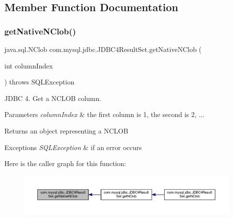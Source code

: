 \subsection{Member Function Documentation}
\mbox{\label{classcom_1_1mysql_1_1jdbc_1_1_j_d_b_c4_result_set_a6bf40393d9b07a198cc49ca934d42f10}} 
\subsubsection{\texorpdfstring{get\+Native\+N\+Clob()}{getNativeNClob()}}
{\footnotesize\ttfamily java.\+sql.\+N\+Clob com.\+mysql.\+jdbc.\+J\+D\+B\+C4\+Result\+Set.\+get\+Native\+N\+Clob (\begin{DoxyParamCaption}\item[{int}]{column\+Index }\end{DoxyParamCaption}) throws S\+Q\+L\+Exception\hspace{0.3cm}{\ttfamily [protected]}}

J\+D\+BC 4. Get a N\+C\+L\+OB column.


\begin{DoxyParams}{Parameters}
{\em column\+Index} & the first column is 1, the second is 2, ...\\
\hline
\end{DoxyParams}
\begin{DoxyReturn}{Returns}
an object representing a N\+C\+L\+OB
\end{DoxyReturn}

\begin{DoxyExceptions}{Exceptions}
{\em S\+Q\+L\+Exception} & if an error occurs \\
\hline
\end{DoxyExceptions}
Here is the caller graph for this function\+:
\nopagebreak
\begin{figure}[H]
\begin{center}
\leavevmode
\includegraphics[width=350pt]{classcom_1_1mysql_1_1jdbc_1_1_j_d_b_c4_result_set_a6bf40393d9b07a198cc49ca934d42f10_icgraph}
\end{center}
\end{figure}
\mbox{\label{classcom_1_1mysql_1_1jdbc_1_1_j_d_b_c4_result_set_a2581614c5be14cbcdd5e776e4bc7bc52}} 
